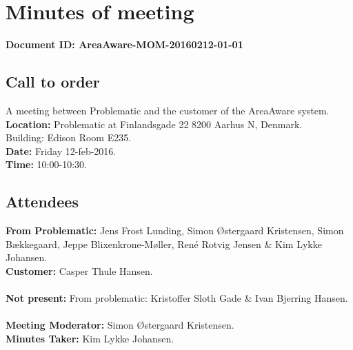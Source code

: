 %
\thispagestyle{fancy}
\chapter*{Minutes of meeting}
\textbf{Document ID: AreaAware-MOM-20160212-01-01}

\section*{Call to order}
A meeting between Problematic and the customer of the AreaAware system.
\textbf{Location:} Problematic at Finlandsgade 22 8200 Aarhus N, Denmark.\\ Building: Edison Room E235.\\
\textbf{Date:} Friday 12-feb-2016. \\
\textbf{Time:} 10:00-10:30.


\section*{Attendees}
\textbf{From Problematic:} Jens Frost Lunding, Simon Østergaard Kristensen, Simon Bækkegaard, Jeppe Blixenkrone-Møller, René Rotvig Jensen \& Kim Lykke Johansen.\\
\textbf{Customer:} Casper Thule Hansen.\\\\
\textbf{Not present:} From problematic: Kristoffer Sloth Gade \& Ivan Bjerring Hansen.\\\\
\textbf{Meeting Moderator:} Simon Østergaard Kristensen.\\
\textbf{Minutes Taker:} Kim Lykke Johansen.

